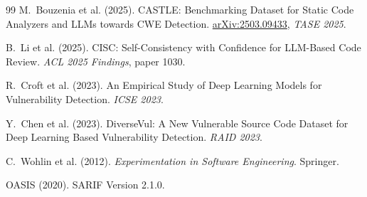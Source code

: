 \documentclass[11pt,a4paper]{article}
\begin{document}
\begin{thebibliography}{99}
M.~Bouzenia et al. (2025).
\newblock CASTLE: Benchmarking Dataset for Static Code Analyzers and
  LLMs towards CWE Detection.
\newblock \href{https://arxiv.org/abs/2503.09433}{arXiv:2503.09433},
  \emph{TASE 2025}.

B.~Li et al. (2025).
\newblock CISC: Self-Consistency with Confidence for LLM-Based Code
  Review.
\newblock \emph{ACL 2025 Findings}, paper 1030.

R.~Croft et al. (2023).
\newblock An Empirical Study of Deep Learning Models for Vulnerability
  Detection.
\newblock \emph{ICSE 2023}.

Y.~Chen et al. (2023).
\newblock DiverseVul: A New Vulnerable Source Code Dataset for Deep
  Learning Based Vulnerability Detection.
\newblock \emph{RAID 2023}.

C.~Wohlin et al. (2012).
\newblock \emph{Experimentation in Software Engineering}.
\newblock Springer.

OASIS (2020).
\newblock SARIF Version 2.1.0.

\end{thebibliography}
\end{document}
